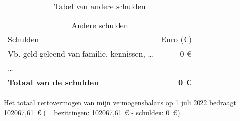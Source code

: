 \begin{table}[!htbp]
	\centering
	\begin{tabular}{@{}lr@{}}
		\toprule
		                \multicolumn{2}{c}{Andere schulden}                 \\
		\cmidrule(r){1-2}
		Schulden                   &     Euro (\euro{}) \\ \midrule
		Vb. geld geleend van familie, kennissen, \dots &          0 \euro{} \\
		\dots                                          &  \\ \toprule
		\textbf{Totaal van de schulden}                & \textbf{0 \euro{}} \\ \bottomrule
	\end{tabular}
	\caption{Tabel van andere schulden}
	\label{tab:tabelandereschulden}
\end{table}

Het totaal nettovermogen van mijn vermogensbalans op 1 juli 2022 bedraagt 102067,61~\euro{} (= bezittingen: 102067,61~\euro{} - schulden: 0~\euro{}).


